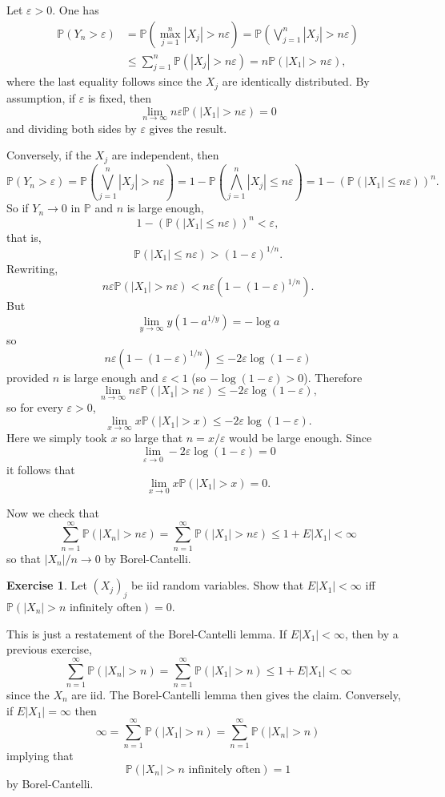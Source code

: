 \documentclass[10pt]{article}
\newcommand{\PP}{\mathbb P}
\theoremstyle{definition}
\newtheorem{exer}{Exercise}
\begin{document}
Let $\varepsilon > 0$. One has
\begin{align*}\PP(Y_n > \varepsilon) &= \PP\left(\max_{j=1}^n |X_j| > n\varepsilon\right) = \PP\left(\bigvee_{j=1}^n |X_j| > n\varepsilon\right)\\
&\leq \sum_{j=1}^n \PP(|X_j| > n\varepsilon) = n \PP(|X_1| > n\varepsilon),\end{align*}
where the last equality follows since the $X_j$ are identically distributed.
By assumption, if $\varepsilon$ is fixed, then
$$\lim_{n \to \infty} n\varepsilon \PP(|X_1| > n\varepsilon) = 0$$
and dividing both sides by $\varepsilon$ gives the result.

Conversely, if the $X_j$ are independent, then
$$\PP(Y_n > \varepsilon) = \PP\left(\bigvee_{j=1}^n |X_j| > n\varepsilon\right) = 1 - \PP\left(\bigwedge_{j=1}^n |X_j| \leq n\varepsilon\right) = 1 - (\PP(|X_1| \leq n\varepsilon))^n.$$
So if $Y_n \to 0$ in $\PP$ and $n$ is large enough,
$$1 - (\PP(|X_1| \leq n\varepsilon))^n < \varepsilon,$$
that is,
$$\PP(|X_1| \leq n\varepsilon) > (1 - \varepsilon)^{1/n}.$$
Rewriting,
$$n\varepsilon \PP(|X_1| > n\varepsilon) < n\varepsilon \left(1 - (1-\varepsilon)^{1/n}\right).$$
But
$$\lim_{y \to \infty} y(1 - a^{1/y}) = -\log a$$
so
$$n\varepsilon \left(1 - (1-\varepsilon)^{1/n}\right) \leq -2\varepsilon \log(1 - \varepsilon)$$
provided $n$ is large enough and $\varepsilon < 1$ (so $-\log(1-\varepsilon) > 0$).
Therefore
$$\lim_{n \to \infty} n\varepsilon \PP(|X_1| > n\varepsilon) \leq -2\varepsilon \log(1 - \varepsilon),$$
so for every $\varepsilon > 0$,
$$\lim_{x \to \infty} x\PP(|X_1| > x) \leq -2\varepsilon \log(1 - \varepsilon).$$
Here we simply took $x$ so large that $n = x/\varepsilon$ would be large enough.
Since
$$\lim_{\varepsilon \to 0} -2\varepsilon \log(1 - \varepsilon) = 0$$
it follows that
$$\lim_{x \to 0} x \PP(|X_1| > x) = 0.$$

Now we check that
$$\sum_{n=1}^\infty \PP(|X_n| > n\varepsilon) = \sum_{n=1}^\infty \PP(|X_1| > n\varepsilon) \leq 1 + E|X_1| < \infty$$
so that $|X_n|/n \to 0$ by Borel-Cantelli.

\begin{exer}
Let $(X_j)_j$ be iid random variables. Show that $E|X_1| < \infty$ iff $\PP(|X_n| > n \text{ infinitely often}) = 0$.
\end{exer}

This is just a restatement of the Borel-Cantelli lemma.
If $E|X_1| < \infty$, then by a previous exercise,
$$\sum_{n=1}^\infty \PP(|X_n| > n) = \sum_{n=1}^\infty \PP(|X_1| > n) \leq 1 + E|X_1| < \infty$$
since the $X_n$ are iid. The Borel-Cantelli lemma then gives the claim.
Conversely, if $E|X_1| = \infty$ then
$$\infty = \sum_{n=1}^\infty \PP(|X_1| > n) = \sum_{n=1}^\infty \PP(|X_n| > n)$$
implying that
$$\PP(|X_n| > n \text{ infinitely often}) = 1$$
by Borel-Cantelli.
\end{document}
